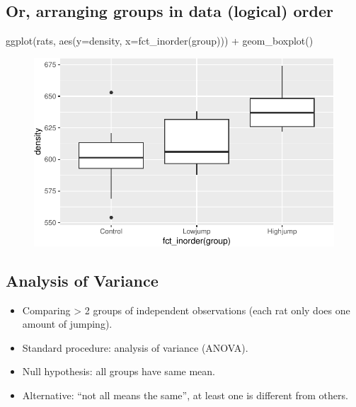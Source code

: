 \documentclass[
  letterpaper,
  DIV=11,
  numbers=noendperiod]{scrartcl}
\newenvironment{Shaded}{\begin{snugshade}}{\end{snugshade}}
\newcommand{\AttributeTok}[1]{\textcolor[rgb]{0.40,0.45,0.13}{#1}}
\newcommand{\FunctionTok}[1]{\textcolor[rgb]{0.28,0.35,0.67}{#1}}
\newcommand{\NormalTok}[1]{\textcolor[rgb]{0.00,0.23,0.31}{#1}}
\newcommand{\SpecialCharTok}[1]{\textcolor[rgb]{0.37,0.37,0.37}{#1}}
\providecommand{\tightlist}{%
  \setlength{\itemsep}{0pt}\setlength{\parskip}{0pt}}\usepackage{longtable,booktabs,array}
\begin{document}
\hypertarget{or-arranging-groups-in-data-logical-order}{%
\subsection{Or, arranging groups in data (logical)
order}\label{or-arranging-groups-in-data-logical-order}}

\begin{Shaded}
\begin{Highlighting}[]
\FunctionTok{ggplot}\NormalTok{(rats, }\FunctionTok{aes}\NormalTok{(}\AttributeTok{y=}\NormalTok{density, }\AttributeTok{x=}\FunctionTok{fct\_inorder}\NormalTok{(group))) }\SpecialCharTok{+}
  \FunctionTok{geom\_boxplot}\NormalTok{()}
\end{Highlighting}
\end{Shaded}

\begin{figure}[H]

{\centering \includegraphics{inference_5_files/figure-pdf/inference-5-R-12-1.pdf}

}

\end{figure}

\hypertarget{analysis-of-variance}{%
\subsection{Analysis of Variance}\label{analysis-of-variance}}

\begin{itemize}
\tightlist
\item
  Comparing \textgreater{} 2 groups of independent observations (each
  rat only does one amount of jumping).
\item
  Standard procedure: analysis of variance (ANOVA).
\item
  Null hypothesis: all groups have same mean.
\item
  Alternative: ``not all means the same'', at least one is different
  from others.
\end{itemize}
\end{document}
